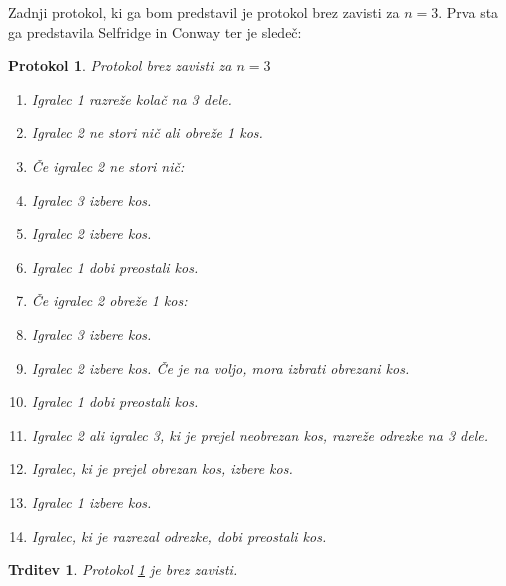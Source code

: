 \documentclass[a4paper, 12pt]{article}
\newtheorem{trditev}{Trditev}
\newtheorem{protokol}{Protokol}
\begin{document}
	Zadnji protokol, ki ga bom predstavil je protokol brez zavisti za $n = 3$. Prva sta ga predstavila Selfridge in Conway ter je sledeč:

	\begin{protokol}
		\label{brez_zavisti}
		Protokol brez zavisti za $n = 3$
		\begin{enumerate}
			
			\item Igralec 1 razreže kolač na 3 dele.
			
			\item Igralec 2 ne stori nič ali obreže 1 kos.
			
			\item[] Če igralec 2 ne stori nič:
			
			\item \qquad Igralec 3 izbere kos.
			
			\item \qquad Igralec 2 izbere kos.
			
			\item \qquad Igralec 1 dobi preostali kos.
			
			\item[] Če igralec 2 obreže 1 kos:
			
			\setcounter{enumi}{2}
			
			\item \qquad Igralec 3 izbere kos.
			
			\item \qquad Igralec 2 izbere kos. Če je na voljo, mora izbrati obrezani kos.
			
			\item \qquad Igralec 1 dobi preostali kos.
			
			\item \qquad Igralec 2 ali igralec 3, ki je prejel neobrezan kos, razreže odrezke na 3 dele.
			
			\item \qquad Igralec, ki je prejel obrezan kos, izbere kos.
			
			\item \qquad Igralec 1 izbere kos.
			
			\item \qquad Igralec, ki je razrezal odrezke, dobi preostali kos.
			
		\end{enumerate}
	\end{protokol}
	
	\begin{trditev}
		Protokol \ref{brez_zavisti} je brez zavisti.
	\end{trditev}
\end{document}
